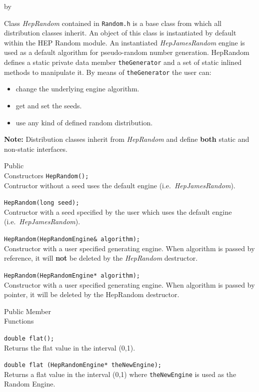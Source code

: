 \documentclass[twoside]{article}
\newcommand{\comp}[1]{\texttt{#1}}%
\newcommand{\entrylabel}[1]{\mbox{\textbf{{#1}}}\hfil}%
\newenvironment{entry}
{\begin{list}{}%
    {\renewcommand{\makelabel}{\entrylabel}%
     \setlength{\labelwidth}{90pt}%
     \setlength{\leftmargin}{\labelwidth}
     \advance\leftmargin by \labelsep%
      }%
    }%
  {\end{list}}
\newcommand{\Entrylabel}[1]%
{\raisebox{0pt}[1ex][0pt]{\makebox[\labelwidth][l]%
    {\parbox[t]{\labelwidth}{\hspace{0pt}\textbf{{#1}}}}}}
\newenvironment{Entry}%
{\renewcommand{\entrylabel}{\Entrylabel}\begin{entry}}%
  {\end{entry}}
\begin{document}
\begin{description}
\begin{Entry}
     Class {\em HepRandom} contained in \comp{Random.h} is a base class
     from which all distribution
     classes inherit.  An object of this class is instantiated by
     default within the HEP Random module.  An instantiated {\em HepJamesRandom}
     engine is used as a default algorithm for pseudo-random number
     generation.  HepRandom defines a static private data member
     \comp{theGenerator} and a set of static inlined methods to
     manipulate it. By means of \comp{theGenerator} the user can:
     \begin{itemize}
        \item change the underlying engine algorithm.
        \item get and set the seeds.
        \item use any kind of defined random distribution.
      \end{itemize}
      {\bf Note:} Distribution classes inherit from {\em HepRandom} and define
      {\bf both} static and non-static interfaces.

\item[Public\\ Constructors]
      \verb+HepRandom();+\\
      Contructor without a seed uses the default engine (i.e.~{\em HepJamesRandom}).

      \verb+HepRandom(long seed);+\\
      Contructor with a seed specified by the user which uses the
      default engine (i.e.~{\em HepJamesRandom}).

      \verb+HepRandom(HepRandomEngine& algorithm);+\\
       Constructor with a user specified generating engine.
       When algorithm is passed by reference, it will {\bf not}
       be deleted by the {\em HepRandom} destructor.

      \verb+HepRandom(HepRandomEngine* algorithm);+\\
      Constructor with a user specified generating engine. When
      algorithm is passed by pointer, it will be deleted by the
      HepRandom destructor.
  
\item[Public Member\\ Functions]

    \verb+double flat();+\\
    Returns the flat value in the interval (0,1).

    \verb+double flat (HepRandomEngine* theNewEngine);+\\
    Returns a flat value in the interval (0,1)
    where \comp{theNewEngine} is used as the Random Engine.


\end{Entry}
\end{description}
\end{document}
